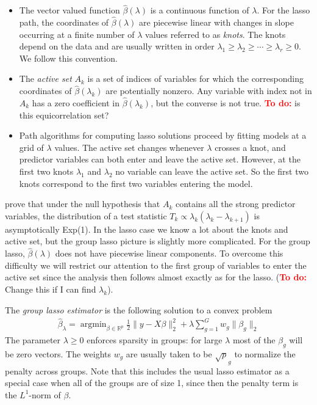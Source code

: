 \documentclass{imsart}
\newcommand{\argmin}{\mathop{\mathrm{argmin}}}
\newcommand{\todo}{\textcolor{red}{\textbf{To do: }}}
\newcommand{\real}{\mathbb{R}}
\begin{document}
\begin{itemize}

  \item The vector valued function $\hat \beta(\lambda)$ is a
    continuous function of $\lambda$. For the lasso path, the
    coordinates of $\hat \beta(\lambda)$ are piecewise linear with
    changes in slope occurring at a finite number of $\lambda$ values
    referred to as \emph{knots}. The knots depend on the data and are
    usually written in order $\lambda_1 \geq \lambda_2 \geq \cdots
    \geq \lambda_r \geq 0$. We follow this convention. 

  \item The \emph{active set} $A_k$ is a set of indices of variables
    for which the corresponding coordinates of $\hat \beta(\lambda_k)$
    are potentially nonzero. Any variable with index not in $A_k$ has
    a zero coefficient in $\hat \beta(\lambda_k)$, but the converse is
    not true. \todo{is this equicorrelation set?}
  
  \item Path algorithms for computing lasso solutions proceed by
    fitting models at a grid of $\lambda$ values. The active set
    changes whenever $\lambda$ crosses a knot, and predictor variables
    can both enter and leave the active set. However, at the first two
    knots $\lambda_1$ and $\lambda_2$ no variable can leave the active
    set. So the first two knots correspond to the first two variables
    entering the model. 

\end{itemize}

\cite{significance:lasso} prove that under the null hypothesis that $A_k$
contains all the strong predictor variables, the distribution of a
test statistic $T_k \propto \lambda_k(\lambda_k - \lambda_{k+1})$ is
asymptotically Exp(1). In the lasso case we know a lot about the knots
and active set, but the group lasso picture is slightly more
complicated. For the group lasso, $\hat \beta(\lambda)$ does not have
piecewise linear components. To overcome this difficulty we will
restrict our attention to the first group of variables to enter the
active set since the analysis then follows almost exactly as for the
lasso. (\todo Change this if I can find $\lambda_k$). 

The \emph{group lasso estimator} is the following solution to a convex
problem
\begin{equation}
\begin{aligned}
\label{eq:gsoln}
\displaystyle \hat \beta_\lambda = \argmin_{\beta \in \real^p} \frac{1}{2} \| y - X \beta \|_2^2 +
   \lambda \sum_{g=1}^G w_g \| \beta_g \|_2
\end{aligned}
\end{equation}
The parameter $\lambda \geq 0$ enforces sparsity in groups: for large
$\lambda$ most of the $\beta_g$ will be zero vectors. The weights
$w_g$ are usually taken to be $\sqrt p_g$ to normalize the penalty
across groups.  Note that this includes the usual lasso estimator as a
special case when all of the groups are of size 1, since then the
penalty term is the $L^1$-norm of $\beta$. 
\end{document}
